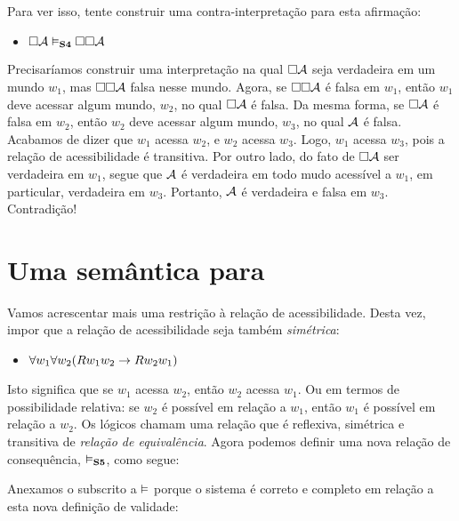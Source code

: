 Para ver isso,  tente construir uma contra-interpretação para esta afirmação:
\begin{itemize}
	\item[]$\Box\mathcal{A} \vDash_{\mathbf{S4}} \Box \Box \mathcal{A}$
\end{itemize}
Precisaríamos construir uma interpretação na qual $\Box\mathcal{A}$ seja verdadeira em um mundo  $w_1$, mas  $\Box \Box \mathcal{A}$  falsa nesse mundo. Agora, se $\Box \Box \mathcal{A}$  é falsa em  $w_1$, então  $w_1$ deve acessar algum mundo, $w_2$, no qual $\Box\mathcal{A}$ é falsa. Da mesma forma, se $\Box \mathcal{A}$ é falsa em $w_2$, então $w_2$ deve acessar algum mundo, $w_3$, no qual $\mathcal{A}$ é falsa. Acabamos de dizer que  $w_1$ acessa $w_2$, e $w_2$ acessa $w_3$. Logo,  $w_1$ acessa $w_3$, pois a relação de acessibilidade é  transitiva.  Por outro lado, do fato de $\Box\mathcal{A}$  ser verdadeira em $w_1$, segue que   $\mathcal{A}$  é verdadeira em todo mudo acessível a $w_1$, em particular, verdadeira em $w_3$.  Portanto, $\mathcal{A}$ é verdadeira e falsa em $w_3$. Contradição!

\section{Uma semântica para  \mlSfive}
\label{SemanticsS5}

Vamos acrescentar mais uma restrição à relação de acessibilidade. Desta vez, impor que a relação de acessibilidade seja também \emph{simétrica}:
\begin{itemize}
	\item $\forall w_1\forall w_2(Rw_1w_2 \rightarrow Rw_2w_1)$
\end{itemize}
Isto significa que se  $w_1$ acessa $w_2$, então $w_2$ acessa  $w_1$. Ou em termos de possibilidade relativa: se $w_2$ é possível em relação a  $w_1$, então  $w_1$ é possível em relação a $w_2$. Os lógicos chamam uma relação que é reflexiva, simétrica e transitiva de \emph{relação de equivalência}. Agora podemos  definir uma nova relação de consequência, $\vDash_{\mathbf{S5}} $, como segue:

Anexamos o subscrito \mlSfive{} a $\vDash$ porque  o sistema \mlSfive{} é correto e completo em relação a esta nova definição de validade:


